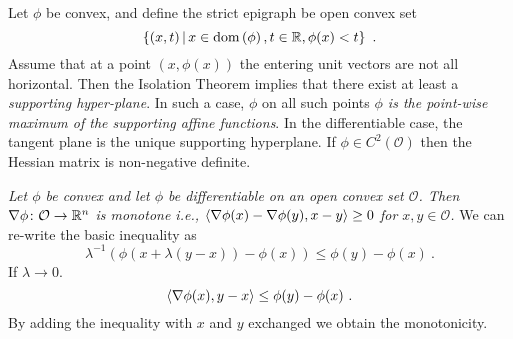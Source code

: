 \documentclass[12pt,a4paper]{amsart}
\theoremstyle{plain}%
\theoremstyle{definition}
\theoremstyle{remark}
\begin{document}
Let $\phi$ be convex, and define the strict epigraph be open convex set
\begin{equation*}
\left\{(x,t) \, \middle| \,  x \in \operatorname{dom}\left(\phi\right), t \in \mathbb{R}, \phi(x) < t \right\} \ .
\end{equation*}
Assume that at a point $(x,\phi(x))$ the entering unit vectors are not all horizontal. Then the Isolation Theorem implies that there exist at least a \emph{supporting hyper-plane}. In such a case, $\phi$ on all such points \emph{$\phi$ is the point-wise maximum of the supporting affine functions}. In the differentiable case, the tangent plane is the unique supporting hyperplane. If $\phi \in C^2(\mathcal O)$ then the Hessian matrix is non-negative definite.

\emph{Let $\phi$ be convex and let $\phi$ be differentiable on an open convex set $\mathcal O$. Then $\nabla \phi \colon \mathcal O \to \mathbb{R}^n$ is \emph{monotone} i.e., $\left\langle\nabla \phi(x) - \nabla \phi(y),x-y\right\rangle \geq 0$ for $x,y \in \mathcal O$.} We can re-write the basic inequality as
\begin{equation*}
  \lambda^{-1}\left(\phi(x + \lambda(y-x))-\phi(x)\right) \leq \phi(y) - \phi(x) \ . 
\end{equation*}
If $\lambda \to 0$.
\begin{equation*}
  \left\langle\nabla \phi(x),y-x\right\rangle \leq \phi(y) - \phi(x) \ .
\end{equation*}
By adding the inequality with $x$ and $y$ exchanged we obtain the monotonicity.
\end{document}
